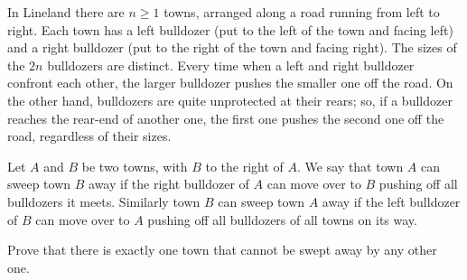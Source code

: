 In Lineland there are 
$n\geq1$
 towns, arranged along a road running from left to right. Each town has a 
left bulldozer
 (put to the left of the town and facing left) and a 
right bulldozer
 (put to the right of the town and facing right). The sizes of the 
$2n$
 bulldozers are distinct. Every time when a left and right bulldozer confront each other, the larger bulldozer pushes the smaller one off the road. On the other hand, bulldozers are quite unprotected at their rears; so, if a bulldozer reaches the rear-end of another one, the first one pushes the second one off the road, regardless of their sizes.

Let 
$A$
 and 
$B$
 be two towns, with 
$B$
 to the right of 
$A$.
 We say that town 
$A$
 can 
sweep
 town 
$B$
away
 if the right bulldozer of 
$A$
 can move over to 
$B$
 pushing off all bulldozers it meets. Similarly town 
$B$
 can sweep town 
$A$
 away if the left bulldozer of 
$B$
 can move over to 
$A$
 pushing off all bulldozers of all towns on its way.

Prove that there is exactly one town that cannot be swept away by any other one.